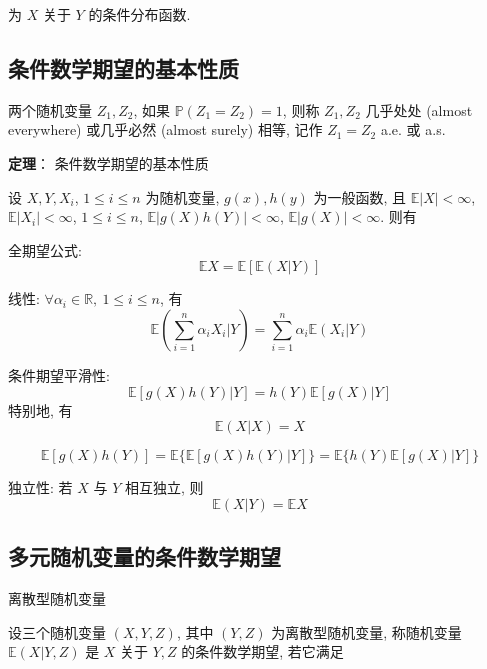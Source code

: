 \documentclass[openany]{ctexbook}
\theoremstyle{kaiti}
\theoremstyle{normal}
\begin{document}
为 $X$ 关于 $Y$ 的条件分布函数.

\subsection{条件数学期望的基本性质}

两个随机变量 $Z_1,Z_2$, 如果 $\mathbb{P}(Z_1=Z_2)=1$, 则称 $Z_1,Z_2$ 几乎处处 (almost everywhere) 或几乎必然 (almost surely) 相等, 记作 $Z_1=Z_2$ a.e. 或 a.s.

\textbf{定理}： 条件数学期望的基本性质

设 $X,Y,X_i$, $1\leqslant i\leqslant n$ 为随机变量, $g(x),h(y)$ 为一般函数, 且 $\mathbb{E}|X|<\infty$, $\mathbb{E}|X_i|<\infty$, $1\leqslant i\leqslant n$, $\mathbb{E}|g(X)h(Y)|<\infty$, $\mathbb{E}|g(X)|<\infty$. 则有

全期望公式:
\begin{equation}
  \mathbb{E}X=\mathbb{E}[\mathbb{E}(X|Y)]
\end{equation}

线性: $\forall \alpha_i\in\mathbb{R},~1\leqslant i\leqslant n$, 有
\begin{equation}
  \mathbb{E}\left(\sum_{i=1}^n\alpha_iX_i\Big|Y\right)=\sum_{i=1}^n\alpha_i\mathbb{E}(X_i|Y)
\end{equation}

条件期望平滑性:
\begin{equation}
  \mathbb{E}[g(X)h(Y)|Y]=h(Y)\mathbb{E}[g(X)|Y]
\end{equation}
特别地, 有
\begin{equation}
  \mathbb{E}(X|X)=X
\end{equation}

\begin{equation}
  \mathbb{E}[g(X)h(Y)]=\mathbb{E}\{\mathbb{E}[g(X)h(Y)|Y]\}=\mathbb{E}\{h(Y)\mathbb{E}[g(X)|Y]\}
\end{equation}

独立性: 若 $X$ 与 $Y$ 相互独立, 则
\begin{equation}
  \mathbb{E}(X|Y)=\mathbb{E}X
\end{equation}

\subsection{多元随机变量的条件数学期望}

离散型随机变量

设三个随机变量 $(X,Y,Z)$, 其中 $(Y,Z)$ 为离散型随机变量, 称随机变量 $\mathbb{E}(X|Y,Z)$ 是 $X$ 关于 $Y,Z$ 的条件数学期望, 若它满足
\end{document}
